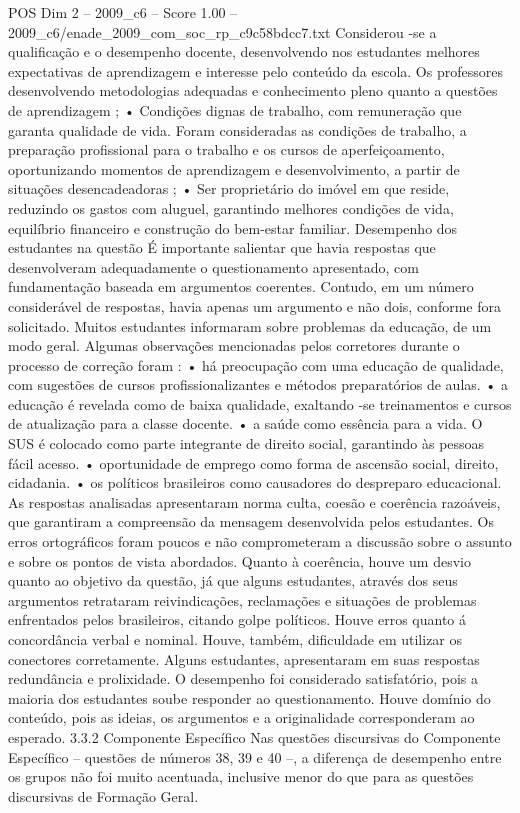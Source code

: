 \begin{textsample}{POS Dim 2 – 2009\_c6 – Score 1.00 – 2009\_c6/enade\_2009\_com\_soc\_rp\_c9c58bdcc7.txt}
Considerou -se a qualificação e o desempenho docente, desenvolvendo nos estudantes melhores expectativas de aprendizagem e interesse pelo conteúdo da escola.
Os professores desenvolvendo metodologias adequadas e conhecimento pleno quanto a questões de aprendizagem ; • Condições dignas de trabalho, com remuneração que garanta qualidade de vida.
Foram consideradas as condições de trabalho, a preparação profissional para o trabalho e os cursos de aperfeiçoamento, oportunizando momentos de aprendizagem e desenvolvimento, a partir de situações desencadeadoras ; • Ser proprietário do imóvel em que reside, reduzindo os gastos com aluguel, garantindo melhores condições de vida, equilíbrio financeiro e construção do bem-estar familiar.
Desempenho dos estudantes na questão É importante salientar que havia respostas que desenvolveram adequadamente o questionamento apresentado, com fundamentação baseada em argumentos coerentes.
Contudo, em um número considerável de respostas, havia apenas um argumento e não dois, conforme fora solicitado.
Muitos estudantes informaram sobre problemas da educação, de um modo geral.
Algumas observações mencionadas pelos corretores durante o processo de correção foram : • há preocupação com uma educação de qualidade, com sugestões de cursos profissionalizantes e métodos preparatórios de aulas. • a educação é revelada como de baixa qualidade, exaltando -se treinamentos e cursos de atualização para a classe docente. • a saúde como essência para a vida.
O SUS é colocado como parte integrante de direito social, garantindo às pessoas fácil acesso. • oportunidade de emprego como forma de ascensão social, direito, cidadania. • os políticos brasileiros como causadores do despreparo educacional.
As respostas analisadas apresentaram norma culta, coesão e coerência razoáveis, que garantiram a compreensão da mensagem desenvolvida pelos estudantes.
Os erros ortográficos foram poucos e não comprometeram a discussão sobre o assunto e sobre os pontos de vista abordados.
Quanto à coerência, houve um desvio quanto ao objetivo da questão, já que alguns estudantes, através dos seus argumentos retrataram reivindicações, reclamações e situações de problemas enfrentados pelos brasileiros, citando golpe políticos.
Houve erros quanto á concordância verbal e nominal.
Houve, também, dificuldade em utilizar os conectores corretamente.
Alguns estudantes, apresentaram em suas respostas redundância e prolixidade.
O desempenho foi considerado satisfatório, pois a maioria dos estudantes soube responder ao questionamento.
Houve domínio do conteúdo, pois as ideias, os argumentos e a originalidade corresponderam ao esperado. 3.3.2 Componente Específico Nas questões discursivas do Componente Específico – questões de números 38, 39 e 40 –, a diferença de desempenho entre os grupos não foi muito acentuada, inclusive menor do que para as questões discursivas de Formação Geral.

\end{textsample}
